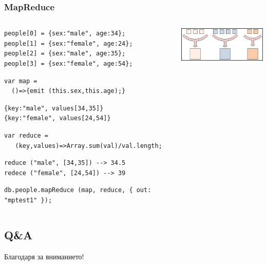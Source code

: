 \documentclass{beamer}
\begin{document}
\begin{frame}[fragile]
\frametitle{MapReduce}

\begin{columns}
  \begin{column}{0.6\textwidth}


\begin{lstlisting}
people[0] = {sex:"male", age:34};
people[1] = {sex:"female", age:24};
people[2] = {sex:"male", age:35};
people[3] = {sex:"female", age:54};
\end{lstlisting}


\vspace{0.2cm}
\pause


\begin{lstlisting}
var map =
  ()=>{emit (this.sex,this.age);}
\end{lstlisting}

\vspace{0.2cm}
\pause



\begin{lstlisting}
{key:"male", values[34,35]}
{key:"female", values[24,54]}
\end{lstlisting}




\vspace{0.2cm}
\pause

\begin{lstlisting}
var reduce =
   (key,values)=>Array.sum(val)/val.length;
\end{lstlisting}

\vspace{0.2cm}
\pause


\begin{lstlisting}
reduce ("male", [34,35]) --> 34.5
redece ("female", [24,54]) --> 39
\end{lstlisting}

\pause
\begin{lstlisting}
db.people.mapReduce (map, reduce, { out: "mptest1" });
\end{lstlisting}



  \end{column}
  \begin{column}{0.4\textwidth}
    \includegraphics[width=5cm]{images/mapreduce}
  \end{column}
\end{columns}



\end{frame}


\subsection{Q\&A}

\begin{frame}
\centerline{Благодаря за вниманието!}
\end{frame}
\end{document}
